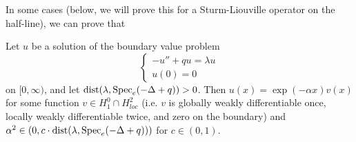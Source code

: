 \documentclass[../main.tex]{subfiles}
\begin{document}
In some cases (below, we will prove this for a Sturm-Liouville operator on the half-line), we can prove that 
\begin{theorem}
Let $u$ be a solution of the boundary value problem
$$
\begin{cases}
-u'' + qu = \lambda u \\
u(0) = 0
\end{cases}
$$
on $[0, \infty)$, and let $\mathrm{dist}(\lambda, \mathrm{Spec}_e(-\Delta + q)) > 0$. Then $u(x) = \exp(-\alpha x) v(x)$ for some function $v \in H_1^0 \cap H^2_{loc}$ (i.e. $v$ is globally weakly differentiable once, locally weakly differentiable twice, and zero on the boundary) and $\alpha^2 \in (0, c\cdot\mathrm{dist}(\lambda, \mathrm{Spec}_e(-\Delta + q)))$ for $c \in (0, 1)$.
\end{theorem}
\end{document}
